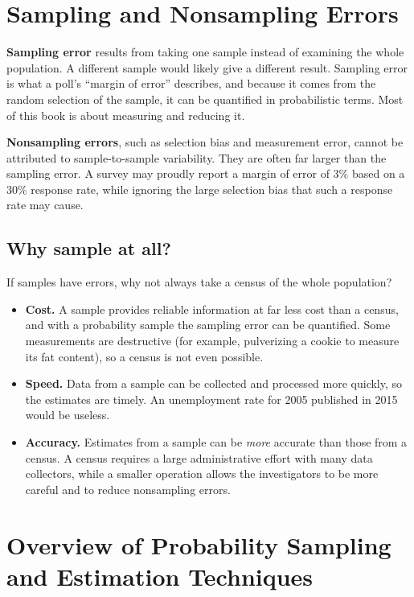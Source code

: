 \documentclass[
  letterpaper,
  DIV=11,
  numbers=noendperiod]{scrreprt}
\providecommand{\tightlist}{%
  \setlength{\itemsep}{0pt}\setlength{\parskip}{0pt}}
\renewcommand{\[}{\begin{equation}}
\renewcommand{\]}{\end{equation}}
\begin{document}
\section{Sampling and Nonsampling Errors}\label{sec-intro-errors}

\textbf{Sampling error} results from taking one sample instead of
examining the whole population. A different sample would likely give a
different result. Sampling error is what a poll's ``margin of error''
describes, and because it comes from the random selection of the sample,
it can be quantified in probabilistic terms. Most of this book is about
measuring and reducing it.

\textbf{Nonsampling errors}, such as selection bias and measurement
error, cannot be attributed to sample-to-sample variability. They are
often far larger than the sampling error. A survey may proudly report a
margin of error of 3\% based on a 30\% response rate, while ignoring the
large selection bias that such a response rate may cause.

\subsection{Why sample at all?}\label{why-sample-at-all}

If samples have errors, why not always take a census of the whole
population?

\begin{itemize}
\tightlist
\item
  \textbf{Cost.} A sample provides reliable information at far less cost
  than a census, and with a probability sample the sampling error can be
  quantified. Some measurements are destructive (for example,
  pulverizing a cookie to measure its fat content), so a census is not
  even possible.
\item
  \textbf{Speed.} Data from a sample can be collected and processed more
  quickly, so the estimates are timely. An unemployment rate for 2005
  published in 2015 would be useless.
\item
  \textbf{Accuracy.} Estimates from a sample can be \emph{more} accurate
  than those from a census. A census requires a large administrative
  effort with many data collectors, while a smaller operation allows the
  investigators to be more careful and to reduce nonsampling errors.
\end{itemize}

\section{Overview of Probability Sampling and Estimation
Techniques}\label{sec-intro-designs}
\end{document}
